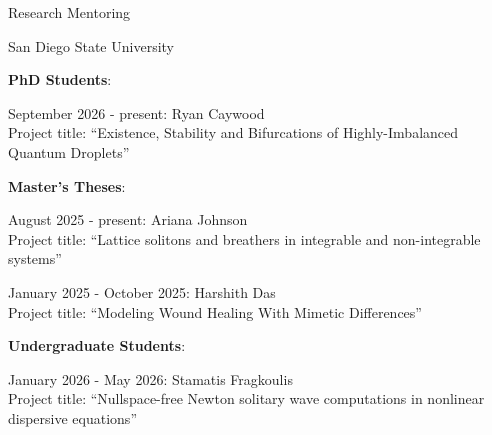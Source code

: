 \documentclass[10pt]{article} %
\newenvironment{outerlist}[1][\enskip\textbullet]%
        {\begin{itemize}[#1]}{\end{itemize}%
         \vspace{-.6\baselineskip}}
\newenvironment{innerlist}[1][\enskip\textbullet]%
        {\begin{compactitem}[#1]}{\end{compactitem}}
\begin{document}
\begin{section}{Research Mentoring}%
\begin{outerlist}

\item[$\bullet$] \vskip -7mm San Diego State University
%
%
%
\begin{innerlist}
 \item[$\triangleright$] \textbf{PhD Students}:
\begin{innerlist}
\item[$\star$] September 2026 - present: Ryan Caywood\\
Project title: ``Existence, Stability and Bifurcations of Highly-Imbalanced Quantum Droplets''
\end{innerlist}
\item[$\triangleright$] \textbf{Master's Theses}:
\begin{innerlist}
\item[$\star$] August 2025 - present: Ariana Johnson\\
Project title: ``Lattice solitons and breathers in integrable and non-integrable systems''
\item[$\star$] January 2025 - October 2025: Harshith Das\\
Project title: ``Modeling Wound Healing With Mimetic Differences''
\end{innerlist}
\item[$\triangleright$] \textbf{Undergraduate Students}:
\begin{innerlist}
\item[$\star$] January 2026 - May 2026: Stamatis Fragkoulis\\
Project title: ``Nullspace-free Newton solitary wave computations
in nonlinear dispersive equations''
\end{innerlist}
\end{innerlist}


\end{outerlist}
\end{section}
\end{document}

